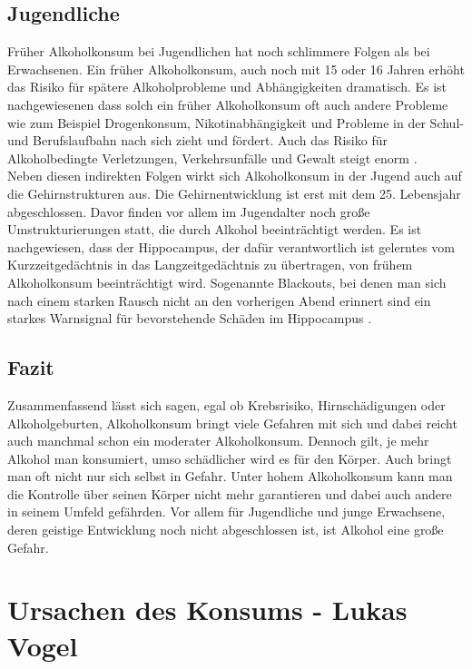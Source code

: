 \documentclass[12pt]{article}
\begin{document}
\subsection{Jugendliche}
Früher Alkoholkonsum bei Jugendlichen hat noch schlimmere Folgen als bei Erwachsenen. Ein früher Alkoholkonsum, auch noch mit 15 oder 16 Jahren erhöht das Risiko für spätere Alkoholprobleme und Abhängigkeiten dramatisch. Es ist nachgewiesenen dass solch ein früher Alkoholkonsum oft auch andere Probleme wie zum Beispiel Drogenkonsum, Nikotinabhängigkeit und Probleme in der Schul- und Berufslaufbahn nach sich zieht und fördert. Auch das Risiko für Alkoholbedingte Verletzungen, Verkehrsunfälle und Gewalt steigt enorm \autocite[27]{kuhn_empfehlungen_nodate}. \\
Neben diesen indirekten Folgen wirkt sich Alkoholkonsum in der Jugend auch auf die Gehirnstrukturen aus. Die Gehirnentwicklung ist erst mit dem 25. Lebensjahr abgeschlossen. Davor finden vor allem im Jugendalter noch große Umstrukturierungen statt, die durch Alkohol beeinträchtigt werden. Es ist nachgewiesen, dass der Hippocampus, der dafür verantwortlich ist gelerntes vom Kurzzeitgedächtnis in das Langzeitgedächtnis zu übertragen, von frühem Alkoholkonsum beeinträchtigt wird. Sogenannte Blackouts, bei denen man sich nach einem starken Rausch nicht an den vorherigen Abend erinnert sind ein starkes Warnsignal für bevorstehende Schäden im Hippocampus \autocite{noauthor_topthema_nodate}.

\subsection{Fazit}
Zusammenfassend lässt sich sagen, egal ob Krebsrisiko, Hirnschädigungen oder Alkoholgeburten, Alkoholkonsum bringt viele Gefahren mit sich und dabei reicht auch manchmal schon ein moderater Alkoholkonsum. Dennoch gilt, je mehr Alkohol man konsumiert, umso schädlicher wird es für den Körper. Auch bringt man oft nicht nur sich selbst in Gefahr. Unter hohem Alkoholkonsum kann man die Kontrolle über seinen Körper nicht mehr garantieren und dabei auch andere in seinem Umfeld gefährden. Vor allem für Jugendliche und junge Erwachsene, deren geistige Entwicklung noch nicht abgeschlossen ist, ist Alkohol eine große Gefahr. 
\section{Ursachen des Konsums \footnotesize{- Lukas Vogel}}
\end{document}
